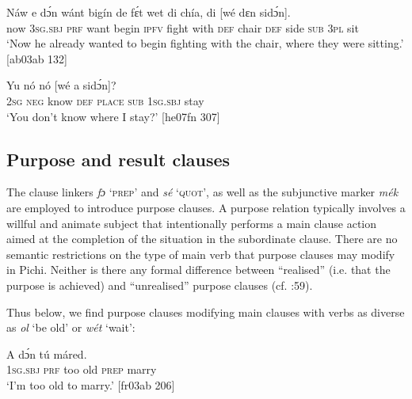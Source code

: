 \ea%
    \label{ex:key:1489}
    \gll Náw    e    dɔ́n  wánt  bigín  de  fɛ́t    wet
di  chía,  di    [wé    dɛn  sidɔ́n]. \\
now    \textsc{3sg.sbj}  \textsc{prf}  want  begin  \textsc{ipfv}  fight  with
\textsc{def}  chair  \textsc{def}  side   \textsc{sub}    \textsc{3pl}  sit\\

\glt ‘Now he already wanted to begin fighting with the chair, 
where they were sitting.’ [ab03ab 132]
\z


\ea%
    \label{ex:key:1490}
    \gll Yu  nó  nó          [wé    a    sidɔ́n]?\\
\textsc{2sg}  \textsc{neg}  know  \textsc{def}  \textsc{place}   \textsc{sub}    \textsc{1sg.sbj}  stay\\

\glt ‘You don’t know where I stay?’ [he07fn 307]
\z

\subsection{Purpose and result clauses}\label{sec:10.7.6}

The clause linkers \textit{fɔ} ‘\textsc{prep}’ and \textit{sé} ‘\textsc{quot}’, as well as the subjunctive marker \textit{mék} are employed to introduce purpose clauses. A purpose relation typically involves a willful and animate subject that intentionally performs a main clause action aimed at the completion of the situation in the subordinate clause. There are no semantic restrictions on the type of main verb that purpose clauses may modify in Pichi. Neither is there any formal difference between “realised” (i.e. that the purpose is achieved) and “unrealised” purpose clauses (cf. \citealt{Bickerton1981}:59).


Thus below, we find purpose clauses modifying main clauses with verbs as diverse as \textit{ol} ‘be old’ or \textit{wét} ‘wait’:



\ea%
    \label{ex:key:1491}
    \gll \MakeUppercase{A}   dɔ́n    tú     máred.\\
\textsc{1sg.sbj}  \textsc{prf}    too  old  \textsc{prep}  marry\\

\glt ‘I’m too old to marry.’ [fr03ab 206]
\z


